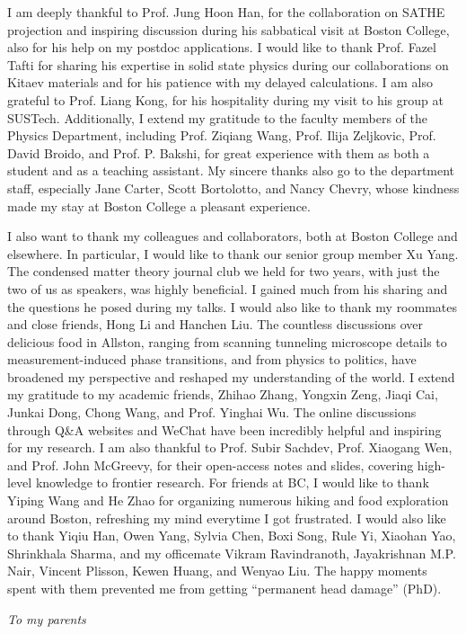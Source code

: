 I am deeply thankful to Prof. Jung Hoon Han, for the collaboration on SATHE projection and inspiring discussion during his sabbatical visit at Boston College, also for his help on my postdoc applications. I would like to thank Prof. Fazel Tafti for sharing his expertise in solid state physics during our collaborations on Kitaev materials and for his patience with my delayed calculations. I am also grateful to Prof. Liang Kong, for his hospitality during my visit to his group at SUSTech. Additionally, I extend my gratitude to the faculty members of the Physics Department, including Prof. Ziqiang Wang, Prof. Ilija Zeljkovic, Prof. David Broido, and Prof. P. Bakshi, for great experience with them as both a student and as a teaching assistant. My sincere thanks also go to the department staff, especially Jane Carter, Scott Bortolotto, and Nancy Chevry, whose kindness made my stay at Boston College a pleasant experience.


I also want to thank my colleagues and collaborators, both at Boston College and elsewhere. In particular, I would like to thank our senior group member Xu Yang. The condensed matter theory journal club we held for two years, with just the two of us as speakers, was highly beneficial. I gained much from his sharing and the questions he posed during my talks. I would also like to thank my roommates and close friends, Hong Li and Hanchen Liu. The countless discussions over delicious food in Allston, ranging from scanning tunneling microscope details to measurement-induced phase transitions, and from physics to politics, have broadened my perspective and reshaped my understanding of the world. I extend my gratitude to my academic friends, Zhihao Zhang, Yongxin Zeng, Jiaqi Cai, Junkai Dong, Chong Wang, and Prof. Yinghai Wu. The online discussions through Q\&A websites and WeChat have been incredibly helpful and inspiring for my research. I am also thankful to Prof. Subir Sachdev, Prof. Xiaogang Wen, and Prof. John McGreevy, for their open-access notes and slides, covering high-level knowledge to frontier research. For friends at BC, I would like to thank Yiping Wang and He Zhao for organizing numerous hiking and food exploration around Boston, refreshing my mind everytime I got frustrated. I would also like to thank Yiqiu Han, Owen Yang, Sylvia Chen, Boxi Song, Rule Yi, Xiaohan Yao, Shrinkhala Sharma, and my officemate Vikram Ravindranoth, Jayakrishnan M.P. Nair, Vincent Plisson, Kewen Huang, and Wenyao Liu. The happy moments spent with them prevented me from getting ``permanent head damage'' (PhD).





\pagebreak


\begin{center}
    \vspace*{\fill}
    \huge\emph{To my parents}
    \vfill\null
\end{center}